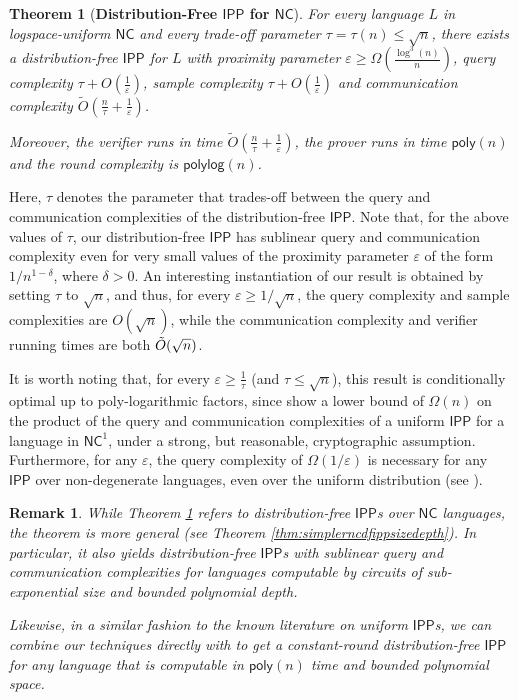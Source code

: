 \documentclass[10pt,a4paper]{article}
\newtheorem{theorem}{Theorem}[section]
\newtheorem{remark}{Remark}
\newcommand{\poly}{\mathsf{poly}}
\newcommand{\polylog}{\mathsf{polylog}}
\newcommand{\NC}{\mathsf{NC}}
\newcommand{\IPP}{\mathsf{IPP}}
\newcommand{\eps}{\varepsilon}
\begin{document}
\begin{theorem}[\textbf{Distribution-Free $\IPP$ for $\NC$}]
    \label{thm:informal_dfipp_nc}
    For every language $L$ in logspace-uniform $\NC$ and every trade-off parameter $\tau=\tau(n) \leq \sqrt{n}$, there exists a distribution-free $\IPP$ for $L$ with proximity parameter $\varepsilon\geq \Omega\left(\frac{\log^3 (n)}{n}\right)$, query complexity $\tau+O\left(\frac{1}{\eps}\right)$, sample complexity $\tau+O\left(\frac{1}{\eps}\right)$ and communication complexity $\tilde{O}\left(\frac{n}{\tau}+\frac{1}{\eps}\right)$. 
    
    Moreover, the verifier runs in time $\tilde{O}\left(\frac{n}{\tau} +\frac{1}{\eps}\right)$, the prover runs in time $\poly(n)$ and the round complexity is $\polylog(n)$.
\end{theorem}

Here, $\tau$ denotes the parameter that trades-off between the query and communication complexities of the distribution-free $\IPP$. Note that, for the above values of $\tau$, our distribution-free $\IPP$ has sublinear query and communication complexity even for very small values of the proximity parameter $\varepsilon$ of the form $1/n^{1-\delta}$, where $\delta > 0$. An interesting instantiation of our result is obtained by setting $\tau$ to $\sqrt{n}$, and thus, for every $\eps \geq 1/\sqrt{n}$, the query complexity and sample complexities are $O(\sqrt{n})$, while the communication complexity and verifier running times are both $\Tilde{O}(\sqrt{n})$. 

It is worth noting that, for every $\eps\geq \frac{1}{\tau}$ (and $\tau \leq \sqrt{n}$), this result is conditionally optimal up to poly-logarithmic factors, since \cite{KR15} show a lower bound of $\Omega(n)$ on the product of the query and communication complexities of a uniform $\IPP$ for a language in $\NC^1$, under a strong, but reasonable, cryptographic assumption. Furthermore, for any $\varepsilon$, the query complexity of $\Omega(1/\varepsilon)$ is necessary for any $\IPP$ over non-degenerate languages, even over the uniform distribution (see \cite[Remark 1.2]{RVW}).

\begin{remark}
While Theorem \ref{thm:informal_dfipp_nc} refers to distribution-free $\IPP$s over $\NC$ languages, the theorem is more general (see Theorem \ref{thm:simplerncdfippsizedepth}). In particular, it also yields distribution-free $\IPP$s with sublinear query and communication complexities for languages computable by circuits of sub-exponential size and bounded polynomial depth.

Likewise, in a similar fashion to the known literature on uniform $\IPP$s, we can combine our techniques directly with \cite{RRR21} to get a constant-round distribution-free $\IPP$ for any language that is computable in $\poly(n)$ time and bounded polynomial space.
\end{remark}
\end{document}
